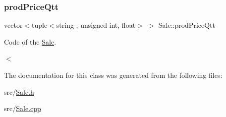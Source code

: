 \subsubsection{\texorpdfstring{prod\+Price\+Qtt}{prodPriceQtt}}
{\footnotesize\ttfamily vector$<$tuple$<$string , unsigned int, float$>$ $>$ Sale\+::prod\+Price\+Qtt\hspace{0.3cm}{\ttfamily [private]}}



Code of the \hyperlink{classSale}{Sale}. 

$<$ 

The documentation for this class was generated from the following files\+:\begin{DoxyCompactItemize}
\item 
src/\hyperlink{Sale_8h}{Sale.\+h}\item 
src/\hyperlink{Sale_8cpp}{Sale.\+cpp}\end{DoxyCompactItemize}
